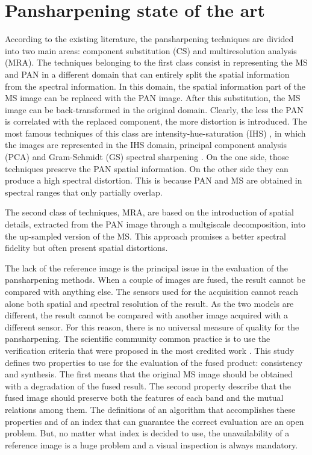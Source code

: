 \documentclass[12pt]{report}
\begin{document}
\chapter{Pansharpening state of the art}


According to the existing literature, the pansharpening techniques are divided into two main areas: component substitution (CS) and multiresolution analysis (MRA). The techniques belonging to the first class consist in representing the MS and PAN in a different domain that can entirely split the spatial information from the spectral information. In this domain, the spatial information part of the MS image can be replaced with the PAN image. After this substitution, the MS image can be back-transformed in the original domain. Clearly, the less the PAN is correlated with the replaced component, the more distortion is introduced. The most famous techniques of this class are intensity-hue-saturation (IHS) \cite{ihs1, ihs2}, in which the images are represented in the IHS domain, principal component analysis (PCA) \cite{scaleinvariance1, pca2} and Gram-Schmidt (GS) spectral sharpening \cite{gs}. On the one side, those techniques preserve the PAN spatial information. On the other side they can produce a high spectral distortion. This is because PAN and MS are obtained in spectral ranges that only partially overlap. 

The second class of techniques, MRA, are based on the introduction of spatial details, extracted from the PAN image through a multgiscale decomposition, into the up-sampled version of the MS. This approach promises a better spectral fidelity but often present spatial distortions.

The lack of the reference image is the principal issue in the evaluation of the pansharpening methods.
When a couple of images are fused, the result cannot be compared with anything else. The sensors used for the acquisition cannot reach alone both spatial and spectral resolution of the result. As the two models are different, the result cannot be compared with another image acquired with a different sensor.
For this reason, there is no universal measure of quality for the pansharpening. The scientific community common practice is to use the verification criteria that were proposed in the most credited work \cite{towaldetal}. This study defines two properties to use for the evaluation of the fused product: consistency and synthesis. The first means that the original MS image should be obtained with a degradation of the fused result.
The second property describe that the fused image should preserve both the features of each band and the mutual relations among them. The definitions of an algorithm that accomplishes these properties and of an index that can guarantee the correct evaluation are an open problem. But, no matter what index is decided to use, the unavailability of a reference image is a huge problem and a visual inspection is always mandatory. 
\end{document}
